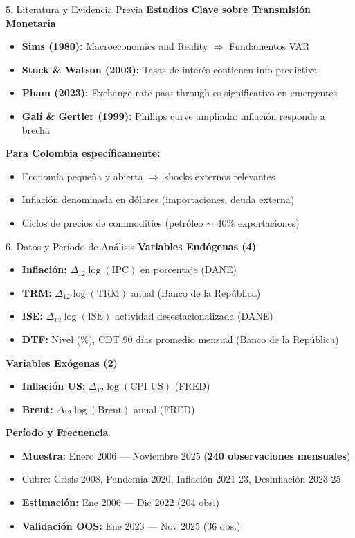 \documentclass[spanish, 11pt]{beamer}
\begin{document}
\begin{frame}{5. Literatura y Evidencia Previa}
\textbf{Estudios Clave sobre Transmisión Monetaria}

\begin{itemize}
  \item \textbf{Sims (1980):} Macroeconomics and Reality $\Rightarrow$ Fundamentos VAR
  \item \textbf{Stock \& Watson (2003):} Tasas de interés contienen info predictiva
  \item \textbf{Pham (2023):} Exchange rate pass-through es significativo en emergentes
  \item \textbf{Galí \& Gertler (1999):} Phillips curve ampliada: inflación responde a brecha
\end{itemize}

\vspace{0.3cm}
\textbf{Para Colombia específicamente:}
\begin{itemize}
  \item Economía pequeña y abierta $\Rightarrow$ shocks externos relevantes
  \item Inflación denominada en dólares (importaciones, deuda externa)
  \item Ciclos de precios de commodities (petróleo $\sim$ 40\% exportaciones)
\end{itemize}
\end{frame}

\begin{frame}{6. Datos y Período de Análisis}
\textbf{Variables Endógenas (4)}
\begin{itemize}
  \item \textbf{Inflación:} $\Delta_{12} \log(\text{IPC})$ en porcentaje (DANE)
  \item \textbf{TRM:} $\Delta_{12} \log(\text{TRM})$ anual (Banco de la República)
  \item \textbf{ISE:} $\Delta_{12} \log(\text{ISE})$ actividad desestacionalizada (DANE)
  \item \textbf{DTF:} Nivel (\%), CDT 90 días promedio mensual (Banco de la República)
\end{itemize}

\textbf{Variables Exógenas (2)}
\begin{itemize}
  \item \textbf{Inflación US:} $\Delta_{12} \log(\text{CPI US})$ (FRED)
  \item \textbf{Brent:} $\Delta_{12} \log(\text{Brent})$ anual (FRED)
\end{itemize}

\textbf{Período y Frecuencia}
\begin{itemize}
  \item \textbf{Muestra:} Enero 2006 — Noviembre 2025 (\textbf{240 observaciones mensuales})
  \item Cubre: Crisis 2008, Pandemia 2020, Inflación 2021-23, Desinflación 2023-25
  \item \textbf{Estimación:} Ene 2006 — Dic 2022 (204 obs.)
  \item \textbf{Validación OOS:} Ene 2023 — Nov 2025 (36 obs.)
\end{itemize}
\end{frame}
\end{document}
